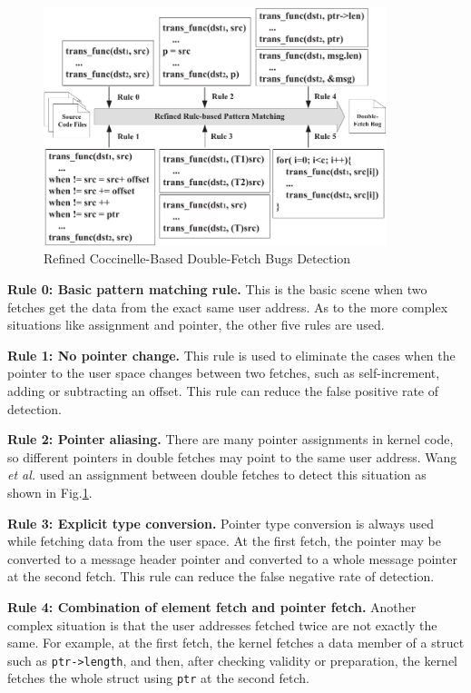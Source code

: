 \documentclass[10pt]{llncs}
\begin{document}
\begin{figure}
  \centering
  \includegraphics[width=10cm]{refined}
  \caption{Refined Coccinelle-Based Double-Fetch Bugs Detection~\cite{wang}}
  \label{Cocci}
\end{figure}


\textbf{Rule 0: Basic pattern matching rule.}
This is the basic scene when two fetches get the data from the exact same user address. As to the more complex situations like assignment and pointer, the other five rules are used.

\textbf{Rule 1: No pointer change.}
This rule is used to eliminate the cases when the pointer to the user space changes between two fetches, such as self-increment, adding or subtracting an offset. This rule can reduce the false positive rate of detection.

\textbf{Rule 2: Pointer aliasing.}
There are many pointer assignments in kernel code, so different pointers in double fetches may point to the same user address. Wang \textit{et al.} used an assignment between double fetches to detect this situation as shown in Fig.\ref{Cocci}.

\textbf{Rule 3: Explicit type conversion.}
Pointer type conversion is always used while fetching data from the user space. At the first fetch, the pointer may be converted to a message header pointer and converted to a whole message pointer at the second fetch. This rule can reduce the false negative rate of detection.

\textbf{Rule 4: Combination of element fetch and pointer fetch.}
Another complex situation is that the user addresses fetched twice are not exactly the same. For example, at the first fetch, the kernel fetches a data member of a struct such as \verb:ptr->length:, and then, after checking validity or preparation, the kernel fetches the whole struct using \verb:ptr: at the second fetch.
\end{document}
